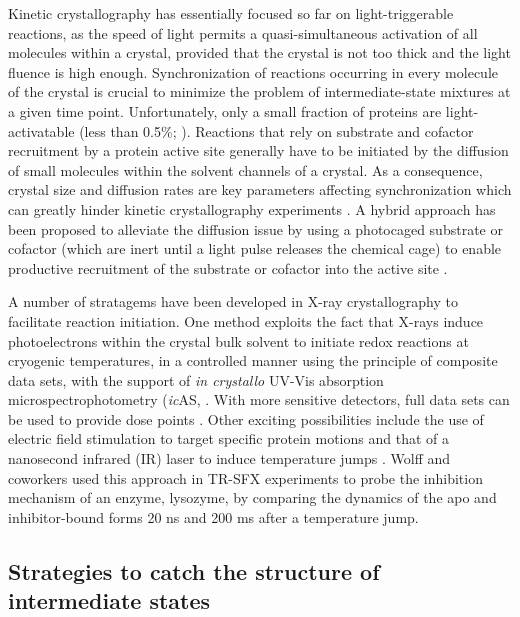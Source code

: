Kinetic crystallography has essentially focused so far on light-triggerable reactions, as the speed of light permits a quasi-simultaneous activation of all molecules within a crystal, provided that the crystal is not too thick and the light fluence is high enough. Synchronization of reactions occurring in every molecule of the crystal is crucial to minimize the problem of intermediate-state mixtures at a given time point. Unfortunately, only a small fraction of proteins are light-activatable (less than 0.5\%; \parencite{monteiroUsingPhotocagingFast2021}). Reactions that rely on substrate and cofactor recruitment by a protein active site generally have to be initiated by the diffusion of small molecules within the solvent channels of a crystal. As a consequence, crystal size and diffusion rates are key parameters affecting synchronization which can greatly hinder kinetic crystallography experiments \parencite{schmidtMixInjectReaction2013}. A hybrid approach has been proposed to alleviate the diffusion issue by using a photocaged substrate or cofactor (which are inert until a light pulse releases the chemical cage) to enable productive recruitment of the substrate or cofactor into the active site \parencite{monteiroUsingPhotocagingFast2021}.

A number of stratagems have been developed in X-ray crystallography to facilitate reaction initiation. One method exploits the fact that X-rays induce photoelectrons within the crystal bulk solvent to initiate redox reactions at cryogenic temperatures, in a controlled manner using the principle of composite data sets, with the support of \textit{in crystallo} UV-Vis absorption microspectrophotometry (\textit{ic}AS, \cite{berglundCatalyticPathwayHorseradish2002}. With more sensitive detectors, full data sets can be used to provide dose points \parencite{roseSingleCrystalSpectroscopy2022}. Other exciting possibilities include the use of electric field stimulation to target specific protein motions \parencite{hekstraElectricfieldstimulatedProteinMechanics2016} and that of a nanosecond infrared (IR) laser to induce temperature jumps \parencite{wolffMappingProteinDynamics2023}. Wolff and coworkers used this approach in TR-SFX experiments to probe the inhibition mechanism of an enzyme, lysozyme, by comparing the dynamics of the apo and inhibitor-bound forms 20 ns and 200 ms after a temperature jump.

\subsection{Strategies to catch the structure of intermediate states}

